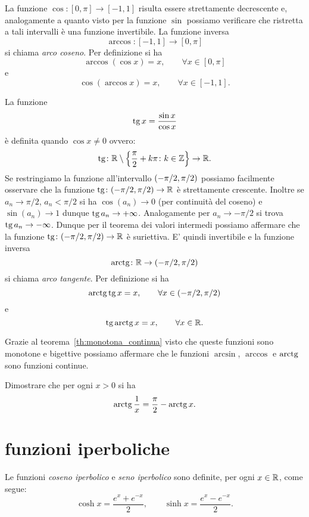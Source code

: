 La funzione $\cos \colon[0,\pi] \to [-1,1]$ risulta essere strettamente
decrescente e, analogamente a quanto visto per la funzione $\sin$
possiamo verificare che ristretta a tali intervalli è una funzione invertibile.
La funzione inversa
\[
  \arccos\colon[-1,1] \to [0,\pi]
\]
si chiama \emph{arco coseno}. Per definizione si ha
\[
  \arccos(\cos x) = x, \qquad \forall x \in [0,\pi]
\]
e
\[
    \cos(\arccos x) = x, \qquad \forall x \in [-1,1].
\]

La funzione
%
\[
\operatorname{tg} x = \frac{\sin x}{\cos x}
\]
è definita quando $\cos x\neq 0$ ovvero:
\[
  \operatorname{tg} \colon {\mathbb R} \setminus{\left\{ \frac \pi 2+ k\pi\colon k\in {\mathbb Z}\right\}} \to {\mathbb R}.
\]
Se restringiamo la funzione all'intervallo ${\left( -\pi/2, \pi/2 \right)}$ possiamo
facilmente osservare che la funzione $\operatorname{tg}\colon(-\pi/2,\pi/2)\to {\mathbb R}$ è strettamente crescente. Inoltre se $a_n \to \pi/2$, $a_n<\pi/2$ si ha $\cos(a_n)\to 0$ (per continuità del coseno) e $\sin(a_n)\to 1$ dunque $\operatorname{tg} a_n\to +\infty$. Analogamente per $a_n \to -\pi/2$ si trova $\operatorname{tg} a_n \to -\infty$. Dunque per il teorema dei valori intermedi possiamo affermare che la funzione $\operatorname{tg}\colon(-\pi/2,\pi/2)\to {\mathbb R}$ è suriettiva. E' quindi invertibile
e la funzione inversa
\[
  \operatorname{arctg} \colon {\mathbb R} \to (-\pi/2,\pi/2)
\]
si chiama \emph{arco tangente}. Per definizione si ha
\[
  \operatorname{arctg} \operatorname{tg} x = x, \qquad \forall x \in (-\pi/2, \pi/2)
\]
e
\[
  \operatorname{tg}\operatorname{arctg} x = x, \qquad \forall x \in {\mathbb R}.
\]

Grazie al teorema~\ref{th:monotona_continua}
visto che queste funzioni sono monotone e bigettive
possiamo affermare che
le funzioni $\arcsin$, $\arccos$ e $\operatorname{arctg}$ sono funzioni continue.

\begin{exercise}
Dimostrare che per ogni $x>0$ si ha
\[
  \operatorname{arctg} \frac 1 x = \frac \pi 2 - \operatorname{arctg} x.
\]
\end{exercise}

\section{funzioni iperboliche}

\begin{definition}
Le funzioni
\emph{coseno iperbolico} e \emph{seno iperbolico}
sono definite, per ogni $x\in {\mathbb R}$,
come segue:
\mymargin{$\sinh$, $\cosh$}%
\index{$\sinh$, $\cosh$}%
%
%
%
\index{$\sinh$}%
\index{$\cosh$}%
\begin{equation}
\label{eq:sinh_cosh}
  \cosh x = \frac{e^x + e^{-x}}{2},
  \qquad
  \sinh x = \frac{e^x - e^{-x}}{2}.
\end{equation}
\end{definition}


